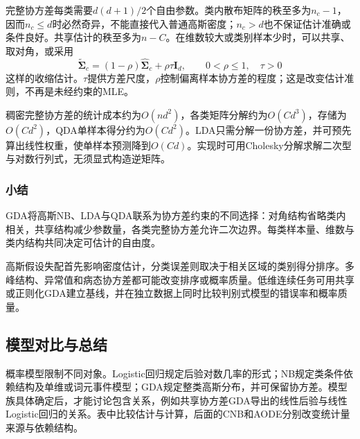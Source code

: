 完整协方差每类需要$d(d+1)/2$个自由参数。类内散布矩阵的秩至多为$n_c-1$，因而$n_c\leq d$时必然奇异，不能直接代入普通高斯密度；$n_c>d$也不保证估计准确或条件良好。共享估计的秩至多为$n-C$。在维数较大或类别样本少时，可以共享、取对角，或采用
\[
  \tilde{\bm{\Sigma}}_c
  =(1-\rho)\hat{\bm{\Sigma}}_c+\rho\tau\bm{I}_d,
  \qquad 0<\rho\leq1,\quad\tau>0
\]
这样的收缩估计。$\tau$提供方差尺度，$\rho$控制偏离样本协方差的程度；这是改变估计准则，不再是未经约束的MLE。

稠密完整协方差的统计成本约为$O(nd^2)$，各类矩阵分解约为$O(Cd^3)$，存储为$O(Cd^2)$，QDA单样本得分约为$O(Cd^2)$。LDA只需分解一份协方差，并可预先算出线性权重，使单样本预测降到$O(Cd)$。实现时可用Cholesky分解求解二次型与对数行列式，无须显式构造逆矩阵。

\subsubsection{小结}
\label{sec:classification-gda-summary}

GDA将高斯NB、LDA与QDA联系为协方差约束的不同选择：对角结构省略类内相关，共享结构减少参数量，各类完整协方差允许二次边界。每类样本量、维数与类内结构共同决定可估计的自由度。

高斯假设失配首先影响密度估计，分类误差则取决于相关区域的类别得分排序。多峰结构、异常值和病态协方差都可能改变排序或概率质量。低维连续任务可用共享或正则化GDA建立基线，并在独立数据上同时比较判别式模型的错误率和概率质量。

\subsection{模型对比与总结}
\label{sec:classification-probability-comparison}

概率模型限制不同对象。Logistic回归规定后验对数几率的形式；NB规定类条件依赖结构及单维或词元事件模型；GDA规定整类高斯分布，并可保留协方差。模型族具体确定后，才能讨论包含关系，例如共享协方差GDA导出的线性后验与线性Logistic回归的关系。表中比较估计与计算，后面的CNB和AODE分别改变统计量来源与依赖结构。

